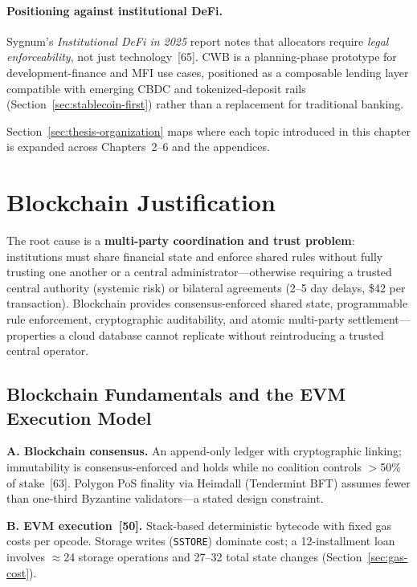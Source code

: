 \documentclass[12pt, a4paper]{report}
\begin{document}
\paragraph{Positioning against institutional DeFi.}
Sygnum's \textit{Institutional DeFi in 2025} report notes that allocators require \textit{legal enforceability}, not just technology~[65]. CWB is a planning-phase prototype for development-finance and MFI use cases, positioned as a composable lending layer compatible with emerging CBDC and tokenized-deposit rails (Section~\ref{sec:stablecoin-first}) rather than a replacement for traditional banking.

Section~\ref{sec:thesis-organization} maps where each topic introduced in this chapter is expanded across Chapters~2--6 and the appendices.

\section{Blockchain Justification}

The root cause is a \textbf{multi-party coordination and trust problem}: institutions must share financial state and enforce shared rules without fully trusting one another or a central administrator---otherwise requiring a trusted central authority (systemic risk) or bilateral agreements (2--5 day delays, \$42 per transaction). Blockchain provides consensus-enforced shared state, programmable rule enforcement, cryptographic auditability, and atomic multi-party settlement---properties a cloud database cannot replicate without reintroducing a trusted central operator.

\subsection{Blockchain Fundamentals and the EVM Execution Model}
\label{sec:blockchain-fundamentals}

\textbf{A. Blockchain consensus.} An append-only ledger with cryptographic linking; immutability is consensus-enforced and holds while no coalition controls $>$50\% of stake~[63]. Polygon PoS finality via Heimdall (Tendermint BFT) assumes fewer than one-third Byzantine validators---a stated design constraint.

\textbf{B. EVM execution~[50].} Stack-based deterministic bytecode with fixed gas costs per opcode. Storage writes (\texttt{SSTORE}) dominate cost; a 12-installment loan involves $\approx$24 storage operations and 27--32 total state changes (Section~\ref{sec:gas-cost}).
\end{document}
